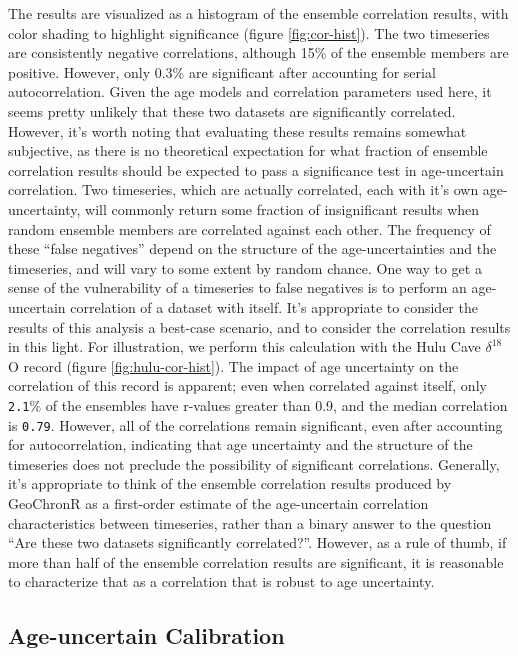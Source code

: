 \documentclass[gchron, manuscript]{copernicus}
\begin{document}
The results are visualized as a histogram of the ensemble correlation results, with color shading to highlight significance (figure \ref{fig:cor-hist}).
The two timeseries are consistently negative correlations, although 15\% of the ensemble members are positive.
However, only 0.3\% are significant after accounting for serial autocorrelation.
Given the age models and correlation parameters used here, it seems pretty unlikely that these two datasets are significantly correlated.
However, it's worth noting that evaluating these results remains somewhat subjective, as there is no theoretical expectation for what fraction of ensemble correlation results should be expected to pass a significance test in age-uncertain correlation.
Two timeseries, which are actually correlated, each with it's own age-uncertainty, will commonly return some fraction of insignificant results when random ensemble members are correlated against each other.
The frequency of these ``false negatives'' depend on the structure of the age-uncertainties and the timeseries, and will vary to some extent by random chance.
One way to get a sense of the vulnerability of a timeseries to false negatives is to perform an age-uncertain correlation of a dataset with itself.
It's appropriate to consider the results of this analysis a best-case scenario, and to consider the correlation results in this light.
For illustration, we perform this calculation with the Hulu Cave \(\delta^{18}\)O record (figure \ref{fig:hulu-cor-hist}).
The impact of age uncertainty on the correlation of this record is apparent; even when correlated against itself, only \texttt{2.1}\% of the ensembles have r-values greater than 0.9, and the median correlation is \texttt{0.79}.
However, all of the correlations remain significant, even after accounting for autocorrelation, indicating that age uncertainty and the structure of the timeseries does not preclude the possibility of significant correlations.
Generally, it's appropriate to think of the ensemble correlation results produced by GeoChronR as a first-order estimate of the age-uncertain correlation characteristics between timeseries, rather than a binary answer to the question ``Are these two datasets significantly correlated?''.
However, as a rule of thumb, if more than half of the ensemble correlation results are significant, it is reasonable to characterize that as a correlation that is robust to age uncertainty.

\subsection{Age-uncertain Calibration}
\end{document}
